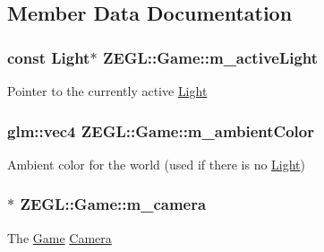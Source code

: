\subsection{Member Data Documentation}
\hypertarget{class_z_e_g_l_1_1_game_aa8ac2fd79809c3ad3477a4d723a7ae10}{}
\subsubsection[{m\+\_\+active\+Light}]{\setlength{\rightskip}{0pt plus 5cm}const {\bf Light}$\ast$ Z\+E\+G\+L\+::\+Game\+::m\+\_\+active\+Light\hspace{0.3cm}{\ttfamily [protected]}}\label{class_z_e_g_l_1_1_game_aa8ac2fd79809c3ad3477a4d723a7ae10}
Pointer to the currently active \hyperlink{class_z_e_g_l_1_1_light}{Light} \hypertarget{class_z_e_g_l_1_1_game_a79bbd0830a4ac01cc820ba5a9bd26cd6}{}
\subsubsection[{m\+\_\+ambient\+Color}]{\setlength{\rightskip}{0pt plus 5cm}glm\+::vec4 Z\+E\+G\+L\+::\+Game\+::m\+\_\+ambient\+Color\hspace{0.3cm}{\ttfamily [protected]}}\label{class_z_e_g_l_1_1_game_a79bbd0830a4ac01cc820ba5a9bd26cd6}
Ambient color for the world (used if there is no \hyperlink{class_z_e_g_l_1_1_light}{Light}) \hypertarget{class_z_e_g_l_1_1_game_a75bf1aabc1dc5ad273611618c3ee05cf}{}
\subsubsection[{m\+\_\+camera}]{$\ast$ Z\+E\+G\+L\+::\+Game\+::m\+\_\+camera\hspace{0.3cm}{\ttfamily [protected]}}\label{class_z_e_g_l_1_1_game_a75bf1aabc1dc5ad273611618c3ee05cf}
The \hyperlink{class_z_e_g_l_1_1_game}{Game} \hyperlink{class_z_e_g_l_1_1_camera}{Camera} \hypertarget{class_z_e_g_l_1_1_game_ab7239deb1a14053ae2d757994f2211d0}{}
